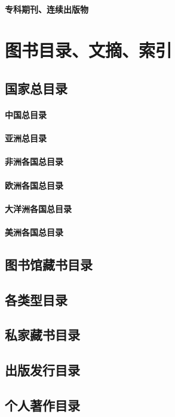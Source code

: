 \documentclass[UTF8]{../ApplicationUniverse}
\begin{document}
\subsubsection{专科期刊、连续出版物}






\chapter{图书目录、文摘、索引}
\section{国家总目录}
    \subsubsection{中国总目录}
    \subsubsection{亚洲总目录}
    \subsubsection{非洲各国总目录}
    \subsubsection{欧洲各国总目录}
    \subsubsection{大洋洲各国总目录}
    \subsubsection{美洲各国总目录}
\section{图书馆藏书目录}
\section{各类型目录}
\section{私家藏书目录}
\section{出版发行目录}
\section{个人著作目录}
\end{document}
